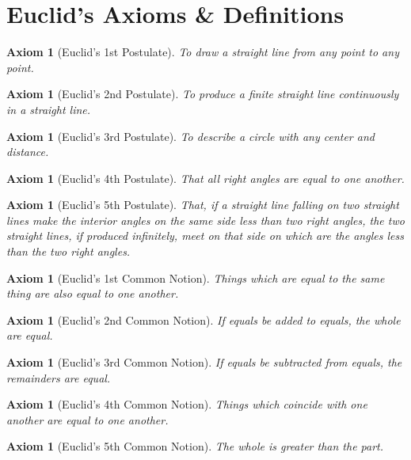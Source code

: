 \documentclass[letterpaper, 12pt]{amsart}
\newtheorem{axe}[thm]{Axiom}
\theoremstyle{definition}  %
\begin{document}
	\section{Euclid's Axioms \& Definitions}
	\label{sec:euclid_s_axioms_&_definitions}
		\begin{axe}[Euclid's 1st Postulate]
		To draw a straight line from any point to any point.
		\end{axe}

		\begin{axe}[Euclid's 2nd Postulate]
		To produce a finite straight line continuously in a straight line.
		\end{axe}

		\begin{axe}[Euclid's 3rd Postulate]
		To describe a circle with any center and distance.
		\end{axe}

		\begin{axe}[Euclid's 4th Postulate]
		That all right angles are equal to one another.
		\end{axe}

		\begin{axe}[Euclid's 5th Postulate]
		That, if a straight line falling on two straight lines make the interior angles on the same side less than two right angles, the two straight lines, if produced infinitely, meet on that side on which are the angles less than the two right angles.
		\end{axe}

		\begin{axe}[Euclid's 1st Common Notion]
		Things which are equal to the same thing are also equal to one another.
		\end{axe}

		\begin{axe}[Euclid's 2nd Common Notion]
		If equals be added to equals, the whole are equal.
		\end{axe}

		\begin{axe}[Euclid's 3rd Common Notion]
		If equals be subtracted from equals, the remainders are equal.
		\end{axe}

		\begin{axe}[Euclid's 4th Common Notion]
		Things which coincide with one another are equal to one another.
		\end{axe}

		\begin{axe}[Euclid's 5th Common Notion]
		The whole is greater than the part.
		\end{axe}
\end{document}
